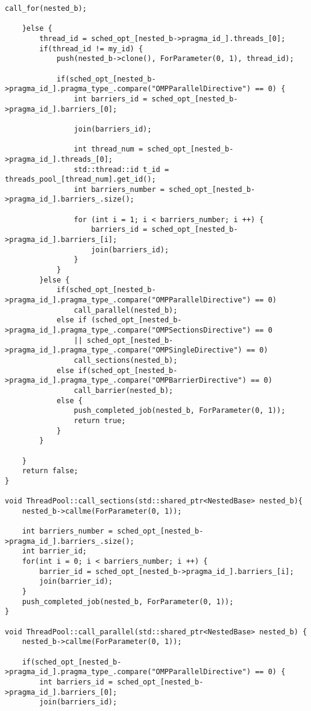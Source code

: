 \documentclass[a4paper,11pt,twoside]{book}
\begin{document}
\begin{lstlisting}[language=CCC, caption=thread\_pool.cpp]
        call_for(nested_b);

    }else {
        thread_id = sched_opt_[nested_b->pragma_id_].threads_[0];
        if(thread_id != my_id) {
            push(nested_b->clone(), ForParameter(0, 1), thread_id);
            
            if(sched_opt_[nested_b->pragma_id_].pragma_type_.compare("OMPParallelDirective") == 0) {
                int barriers_id = sched_opt_[nested_b->pragma_id_].barriers_[0];

                join(barriers_id);
                
                int thread_num = sched_opt_[nested_b->pragma_id_].threads_[0];
                std::thread::id t_id = threads_pool_[thread_num].get_id();
                int barriers_number = sched_opt_[nested_b->pragma_id_].barriers_.size();
                
                for (int i = 1; i < barriers_number; i ++) {
                    barriers_id = sched_opt_[nested_b->pragma_id_].barriers_[i];
                    join(barriers_id);
                }
            }
        }else {
            if(sched_opt_[nested_b->pragma_id_].pragma_type_.compare("OMPParallelDirective") == 0)
                call_parallel(nested_b);
            else if (sched_opt_[nested_b->pragma_id_].pragma_type_.compare("OMPSectionsDirective") == 0
                || sched_opt_[nested_b->pragma_id_].pragma_type_.compare("OMPSingleDirective") == 0)
                call_sections(nested_b);
            else if(sched_opt_[nested_b->pragma_id_].pragma_type_.compare("OMPBarrierDirective") == 0)
                call_barrier(nested_b);
            else {
                push_completed_job(nested_b, ForParameter(0, 1));
                return true;
            }
        }

    }
    return false;
}

void ThreadPool::call_sections(std::shared_ptr<NestedBase> nested_b){
    nested_b->callme(ForParameter(0, 1));
    
    int barriers_number = sched_opt_[nested_b->pragma_id_].barriers_.size();
    int barrier_id;
    for(int i = 0; i < barriers_number; i ++) {
        barrier_id = sched_opt_[nested_b->pragma_id_].barriers_[i];
        join(barrier_id);
    }
    push_completed_job(nested_b, ForParameter(0, 1));
}

void ThreadPool::call_parallel(std::shared_ptr<NestedBase> nested_b) {
    nested_b->callme(ForParameter(0, 1));

    if(sched_opt_[nested_b->pragma_id_].pragma_type_.compare("OMPParallelDirective") == 0) {
        int barriers_id = sched_opt_[nested_b->pragma_id_].barriers_[0];
        join(barriers_id);
            

\end{lstlisting}
\end{document}
